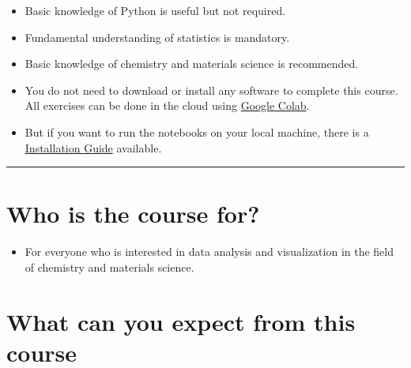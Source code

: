 \documentclass[
  letterpaper,
  DIV=11,
  numbers=noendperiod]{scrreprt}
\providecommand{\tightlist}{%
  \setlength{\itemsep}{0pt}\setlength{\parskip}{0pt}}\usepackage{longtable,booktabs,array}
\begin{document}
\begin{tcolorbox}[enhanced jigsaw, leftrule=.75mm, bottomrule=.15mm, colbacktitle=quarto-callout-warning-color!10!white, title=\textcolor{quarto-callout-warning-color}{\faExclamationTriangle}\hspace{0.5em}{Prequisits}, breakable, arc=.35mm, toptitle=1mm, opacityback=0, titlerule=0mm, coltitle=black, colback=white, opacitybacktitle=0.6, colframe=quarto-callout-warning-color-frame, left=2mm, rightrule=.15mm, toprule=.15mm, bottomtitle=1mm]

\begin{itemize}
\tightlist
\item
  Basic knowledge of Python is useful but not required.
\item
  Fundamental understanding of statistics is mandatory.
\item
  Basic knowledge of chemistry and materials science is recommended.
\item
  You do not need to download or install any software to complete this
  course. All exercises can be done in the cloud using
  \href{https://colab.google/}{Google Colab}.
\item
  But if you want to run the notebooks on your local machine, there is a
  \href{course/chapters/Essentials/InstallationGuide.qmd}{Installation
  Guide} available.
\end{itemize}

\end{tcolorbox}

\begin{center}\rule{0.5\linewidth}{0.5pt}\end{center}

\section{Who is the course for?}\label{who-is-the-course-for}

\begin{itemize}
\tightlist
\item
  For everyone who is interested in data analysis and visualization in
  the field of chemistry and materials science.
\end{itemize}

\section*{What can you expect from this
course}\label{what-can-you-expect-from-this-course}
\end{document}
